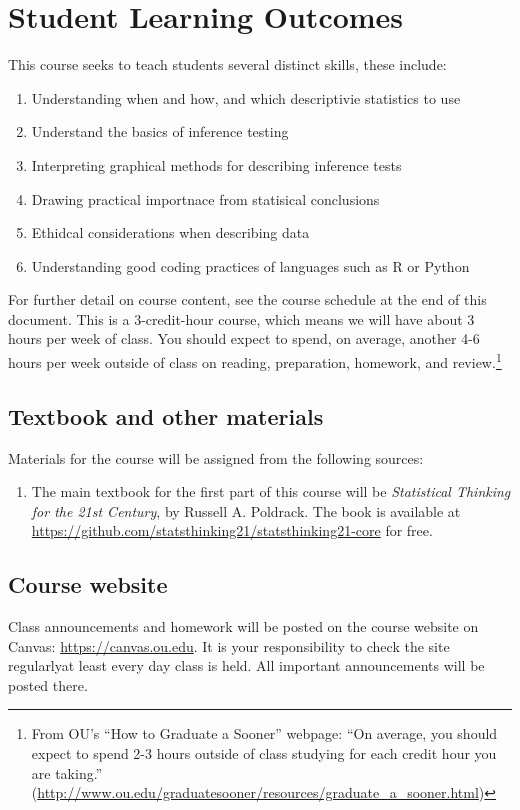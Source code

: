 \documentclass[11pt,english]{article}
\begin{document}
\section*{Student Learning Outcomes}
This course seeks to teach students several distinct skills, these include: 
\begin{enumerate}
\item Understanding when and how, and which descriptivie statistics to use
\item Understand the basics of inference testing
\item Interpreting graphical methods for describing inference tests
\item Drawing practical importnace from statisical conclusions
\item Ethidcal considerations when describing data
\item Understanding good coding practices of languages such as R or Python
\end{enumerate}
For further detail on course content, see the course schedule at the end of this document. This is a 3-credit-hour course, which means we will have about 3 hours per week of class. You should expect to spend, on average, another 4-6 hours per week outside of class on reading, preparation, homework, and review.\footnote{From OU's ``How to Graduate a Sooner'' webpage: ``On average, you should expect to spend 2-3 hours outside of class studying for each credit hour you are taking.'' (\url{http://www.ou.edu/graduatesooner/resources/graduate_a_sooner.html})}


\subsection*{Textbook and other materials}

Materials for the course will be assigned from the following sources:
\begin{enumerate}
    \item The main textbook for the first part of this course will be \emph{Statistical Thinking for the 21st Century}, by Russell A. Poldrack. The book is available at \url{https://github.com/statsthinking21/statsthinking21-core} for free. 
\end{enumerate}

\subsection*{Course website}

Class announcements and homework will be posted on the course website on Canvas: \url{https://canvas.ou.edu}. It is your responsibility to check the site regularly\textemdash at least every day class is held. All important announcements will be posted there.
\end{document}
